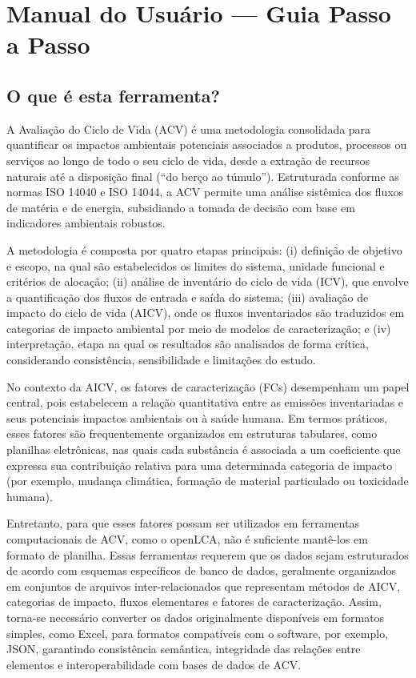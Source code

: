 
\section{Manual do Usu\'ario --- Guia Passo a Passo}
\label{sec:anexo1}

\subsection{O que \'e esta ferramenta?}

A Avaliação do Ciclo de Vida (ACV) é uma metodologia consolidada para quantificar os impactos ambientais potenciais associados a produtos, processos ou serviços ao longo de todo o seu ciclo de vida, desde a extração de recursos naturais até a disposição final (“do berço ao túmulo”). Estruturada conforme as normas ISO 14040 e ISO 14044, a ACV permite uma análise sistêmica dos fluxos de matéria e de energia, subsidiando a tomada de decisão com base em indicadores ambientais robustos.

A metodologia é composta por quatro etapas principais: (i) definição de objetivo e escopo, na qual são estabelecidos os limites do sistema, unidade funcional e critérios de alocação; (ii) análise de inventário do ciclo de vida (ICV), que envolve a quantificação dos fluxos de entrada e saída do sistema; (iii) avaliação de impacto do ciclo de vida (AICV), onde os fluxos inventariados são traduzidos em categorias de impacto ambiental por meio de modelos de caracterização; e (iv) interpretação, etapa na qual os resultados são analisados de forma crítica, considerando consistência, sensibilidade e limitações do estudo.

No contexto da AICV, os fatores de caracterização (FCs) desempenham um papel central, pois estabelecem a relação quantitativa entre as emissões inventariadas e seus potenciais impactos ambientais ou à saúde humana. Em termos práticos, esses fatores são frequentemente organizados em estruturas tabulares, como planilhas eletrônicas, nas quais cada substância é associada a um coeficiente que expressa sua contribuição relativa para uma determinada categoria de impacto (por exemplo, mudança climática, formação de material particulado ou toxicidade humana).

Entretanto, para que esses fatores possam ser utilizados em ferramentas computacionais de ACV, como o openLCA, não é suficiente mantê-los em formato de planilha. Essas ferramentas requerem que os dados sejam estruturados de acordo com esquemas específicos de banco de dados, geralmente organizados em conjuntos de arquivos inter-relacionados que representam métodos de AICV, categorias de impacto, fluxos elementares e fatores de caracterização. Assim, torna-se necessário converter os dados originalmente disponíveis em formatos simples, como Excel, para formatos compatíveis com o software, por exemplo, JSON, garantindo consistência semântica, integridade das relações entre elementos e interoperabilidade com bases de dados de ACV.

